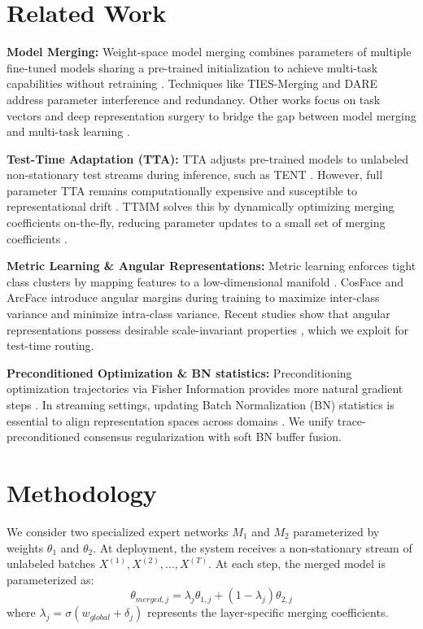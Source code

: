 \documentclass{article}
\theoremstyle{definition}
\theoremstyle{remark}
\begin{document}
\section{Related Work}
\label{sec:related}
\textbf{Model Merging:} Weight-space model merging combines parameters of multiple fine-tuned models sharing a pre-trained initialization to achieve multi-task capabilities without retraining \cite{DudaHart2nd, yang2024_0, saadati2024_5}. Techniques like TIES-Merging \cite{sarkar2024_9} and DARE \cite{chen2024_10} address parameter interference and redundancy. Other works focus on task vectors and deep representation surgery to bridge the gap between model merging and multi-task learning \cite{yang2024_0, lu2023_12, lv2023_13}.

\textbf{Test-Time Adaptation (TTA):} TTA adjusts pre-trained models to unlabeled non-stationary test streams during inference, such as TENT \cite{Samuel59, wang2021_20, niu2023_21}. However, full parameter TTA remains computationally expensive and susceptible to representational drift \cite{karmanov2024_22, yuan2023_23}. TTMM solves this by dynamically optimizing merging coefficients on-the-fly, reducing parameter updates to a small set of merging coefficients \cite{lee2024_25, kim2025_26}.

\textbf{Metric Learning \& Angular Representations:} Metric learning enforces tight class clusters by mapping features to a low-dimensional manifold \cite{sohn2016_111, ermolov2022_112}. CosFace \cite{chen2022_24} and ArcFace \cite{feng2025_102} introduce angular margins during training to maximize inter-class variance and minimize intra-class variance. Recent studies show that angular representations possess desirable scale-invariant properties \cite{xu2025_104, wang2024_105}, which we exploit for test-time routing.

\textbf{Preconditioned Optimization \& BN statistics:} Preconditioning optimization trajectories via Fisher Information provides more natural gradient steps \cite{maddox2019_54, ghahremani2023_121}. In streaming settings, updating Batch Normalization (BN) statistics is essential to align representation spaces across domains \cite{seckler2022_53, luo2020_127, shi2018_129}. We unify trace-preconditioned consensus regularization with soft BN buffer fusion.

\section{Methodology}
\label{sec:method}
We consider two specialized expert networks $M_1$ and $M_2$ parameterized by weights $\theta_1$ and $\theta_2$. At deployment, the system receives a non-stationary stream of unlabeled batches $X^{(1)}, X^{(2)}, \dots, X^{(T)}$. At each step, the merged model is parameterized as:
\begin{equation}
\theta_{merged, j} = \lambda_j \theta_{1, j} + (1 - \lambda_j) \theta_{2, j}
\end{equation}
where $\lambda_j = \sigma(w_{global} + \delta_j)$ represents the layer-specific merging coefficients.
\end{document}
